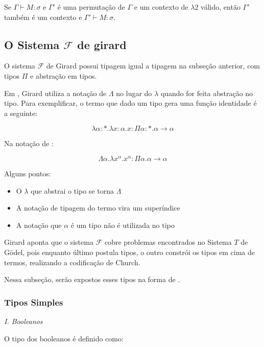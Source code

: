 \documentclass[../main.tex]{subfiles}
\begin{document}
\begin{lemma}
    Se $\Gamma \vdash M : \sigma$ e $\Gamma'$ é uma permutação de $\Gamma$ e um contexto de $\lambda2$ válido, então $\Gamma'$ também é um contexto e $\Gamma' \vdash M : \sigma$.
\end{lemma}

\subsection{O Sistema \texorpdfstring{$\mathcal{F}$}{F} de girard}

O sistema $\mathcal{F}$ de Girard possui tipagem igual a tipagem na subseção anterior, com tipos $\Pi$ e abstração em tipos.

Em \cite{girard1989}, Girard utiliza a notação de $\Lambda$ no lugar do $\lambda$ quando for feita abstração no tipo. Para exemplificar, o termo que dado um tipo gera uma função identidade é a seguinte:

$$\lambda \alpha : \ast . \lambda x : \alpha . x : \Pi \alpha : \ast . \alpha \to \alpha$$

Na notação de \cite{girard1989}:

$$\Lambda \alpha . \lambda x^{\alpha} . x^{\alpha} : \Pi \alpha . \alpha \to \alpha$$

Alguns pontos:

\begin{itemize}
    \item O $\lambda$ que abstrai o tipo se torna $\Lambda$
    \item A notação de tipagem do termo vira um superíndice
    \item A notação que $\alpha$ é um tipo não é utilizada no tipo
\end{itemize}

Girard aponta que o sistema $\mathcal{F}$ cobre problemas encontrados no Sistema $T$ de Gödel, pois enquanto último postula tipos, o outro constrói os tipos em cima de termos, realizando a codificação de Church.

Nessa subseção, serão expostos esses tipos na forma de \cite{girard1989}.

\subsubsection{Tipos Simples}

\emph{I. Booleanos}

O tipo dos booleanos é definido como:
\end{document}
